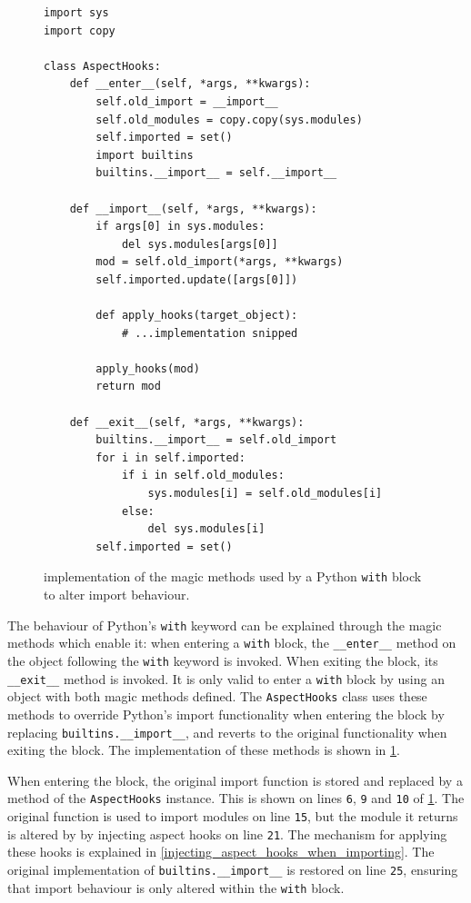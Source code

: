 \begin{figure}
    \centering
    \begin{lstlisting}[style=footnotesize_python]
import sys
import copy

class AspectHooks:
    def __enter__(self, *args, **kwargs):
        self.old_import = __import__
        self.old_modules = copy.copy(sys.modules)
        self.imported = set()
        import builtins
        builtins.__import__ = self.__import__

    def __import__(self, *args, **kwargs):
        if args[0] in sys.modules:
            del sys.modules[args[0]]
        mod = self.old_import(*args, **kwargs)
        self.imported.update([args[0]])
        
        def apply_hooks(target_object):
            # ...implementation snipped

        apply_hooks(mod)
        return mod

    def __exit__(self, *args, **kwargs):
        builtins.__import__ = self.old_import
        for i in self.imported:
            if i in self.old_modules:
                sys.modules[i] = self.old_modules[i]
            else:
                del sys.modules[i]
        self.imported = set()
    \end{lstlisting}
    \caption{\pdsfthree{} implementation of the magic methods used by a Python
    \lstinline{with} block to alter import behaviour.}
    \label{fig:aspecthooksmagicmethodswith}
\end{figure}


The behaviour of Python's \lstinline{with} keyword can be explained through the magic
methods which enable it: when entering a \lstinline{with} block, the
\lstinline{__enter__} method on the object
following the \lstinline{with} keyword is invoked. When exiting the block, its
\lstinline{__exit__} method is invoked. It is only valid to enter a
\lstinline{with} block by using an object with both magic methods defined. The
\lstinline{AspectHooks} class uses these methods to override Python's import
functionality when entering the block by replacing
\lstinline{builtins.__import__}, and reverts to the original functionality when
exiting the block. The implementation of these methods is shown in
\cref{fig:aspecthooksmagicmethodswith}.

When entering the block, the original import function is stored and replaced by
a method of the \lstinline{AspectHooks} instance. This is shown on lines
\texttt{6}, \texttt{9} and \texttt{10} of
\cref{fig:aspecthooksmagicmethodswith}. The original function is used to
import modules on line \texttt{15}, but the module it returns is altered by
\pdsfthree{} by injecting aspect hooks on line \texttt{21}. The mechanism for
applying these hooks is explained in \cref{injecting_aspect_hooks_when_importing}.
The original implementation of \lstinline{builtins.__import__} is restored on
line \texttt{25}, ensuring that import behaviour is only altered within the
\lstinline{with} block.


